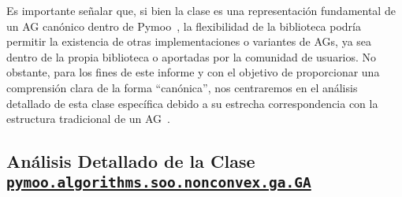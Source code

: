 Es importante señalar que, si bien la clase \texttt{} es una representación fundamental de un AG canónico dentro de Pymoo~\cite{blank2020}, la flexibilidad de la biblioteca podría permitir la existencia de otras implementaciones o variantes de AGs, ya sea dentro de la propia biblioteca o aportadas por la comunidad de usuarios. No obstante, para los fines de este informe y con el objetivo de proporcionar una comprensión clara de la forma ``canónica'', nos centraremos en el análisis detallado de esta clase específica debido a su estrecha correspondencia con la estructura tradicional de un AG~\cite{goldberg1989}.

\subsection{Análisis Detallado de la Clase \texttt{\url{pymoo.algorithms.soo.nonconvex.ga.GA}}}

